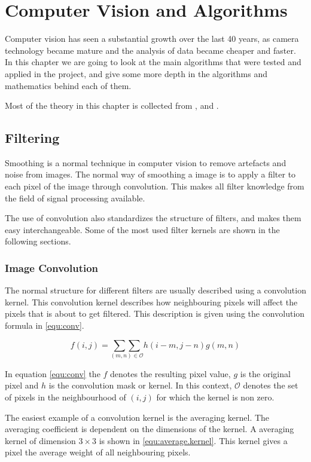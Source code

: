 
\chapter{Computer Vision and Algorithms}

Computer vision has seen a substantial growth over the last 40 years, as camera technology became mature 
and the analysis of data became cheaper and faster. In this chapter we are going to look at the main algorithms 
that were tested and applied in the project, and give some more depth in the algorithms and mathematics behind each of them.

Most of the theory in this chapter is collected from \citet{sonka07}, \citet{tdt4265} and \citet{davies05}.

\section{Filtering}\label{sec:smooth}
Smoothing is a normal technique in computer vision to remove artefacts and noise from images. The normal way 
of smoothing a image is to apply a filter to each pixel of the image through convolution. This makes 
all filter knowledge from the field of signal processing available.

The use of convolution also standardizes the structure of filters, and makes them easy interchangeable. Some 
of the most used filter kernels are shown in the following sections.

\subsection{Image Convolution}
The normal structure for different filters are usually described using a convolution kernel. This convolution kernel 
describes how neighbouring pixels will affect the pixels that is about to get filtered. This 
description is given using the convolution formula in \eqref{equ:conv}.

\begin{equation}\label{equ:conv}
	f(i,j) = \underset{(m,n) \in \mathcal{O}}{\sum \sum} h(i-m,j-n)g(m,n)
\end{equation}

In equation \eqref{equ:conv} the $f$ denotes the resulting pixel value, $g$ is the original pixel and $h$ is the convolution mask or kernel.
In this context, $\mathcal{O}$ denotes the set of pixels in the neighbourhood of $(i,j)$ for which the kernel is non zero.

The easiest example of a convolution kernel is the averaging kernel. The averaging coefficient is dependent on the dimensions of the kernel. 
A averaging kernel of dimension $3 \times 3$ is shown in \eqref{equ:average.kernel}. This kernel gives a pixel the average weight of all 
neighbouring pixels.

